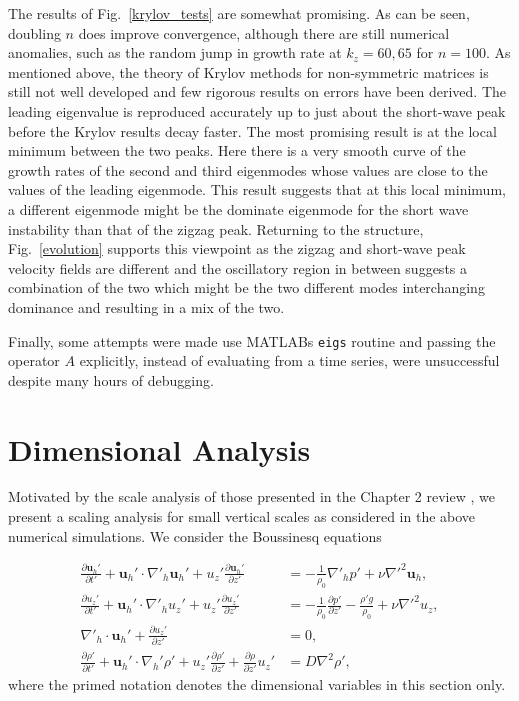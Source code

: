 The results of Fig.~\ref{krylov_tests} are somewhat promising. As can be seen, doubling $n$ does improve convergence, although there are still numerical anomalies, such as the random jump in growth rate at $k_{z}=60,65$ for $n=100$. As mentioned above, the theory of Krylov methods for non-symmetric matrices is still not well developed and few rigorous results on errors have been derived. The leading eigenvalue is reproduced accurately up to just about the short-wave peak before the Krylov results decay faster. The most promising result is at the local minimum between the two peaks. Here there is a very smooth curve of the growth rates of the second and third eigenmodes whose values are close to the values of the leading eigenmode. This result suggests that at this local minimum, a different eigenmode might be the dominate eigenmode for the short wave instability than that of the zigzag peak. Returning to the structure, Fig.~\ref{evolution} supports this viewpoint as the zigzag and short-wave peak velocity fields are different and the oscillatory region in between suggests a combination of the two which might be the two different modes interchanging dominance and resulting in a mix of the two. 

Finally, some attempts were made use MATLABs \texttt{eigs} routine and passing the operator $A$ explicitly, instead of evaluating from a time series, were unsuccessful despite many hours of debugging. 

\section{Dimensional Analysis}
Motivated by the scale analysis of those presented in the Chapter 2 review \cite{lilly1983,rileylelong2000,bc2001,brethouwer2007}, we present a scaling analysis for small vertical scales as considered in the above numerical simulations. We consider the Boussinesq equations

\begin{align}
\frac{\partial \textbf{u}_{h}'}{\partial t'} + \textbf{u}_{h}'\cdot\nabla'_{h}\textbf{u}_{h}'+u_{z}'\frac{\partial \textbf{u}_{h}'}{\partial z'} &= -\frac{1}{\rho_{0}}\nabla'_{h}p' + \nu \nabla'^{2}\textbf{u}_{h}\label{scaling_horz},\\
\frac{\partial u_{z}'}{\partial t'} + \textbf{u}_{h}'\cdot\nabla'_{h}u_{z}'+u_{z}'\frac{\partial u_{z}'}{\partial z'} &= -\frac{1}{\rho_{0}}\frac{\partial p'}{\partial z'} - \frac{\rho' g}{\rho_{0}} + \nu \nabla'^{2}u_{z},\label{scaling_vert}\\
\nabla'_{h}\cdot\textbf{u}_{h}' + \frac{\partial u_{z}'}{\partial z'} &=0,\label{scaling_cont}\\
\frac{\partial \rho'}{\partial t'} + \textbf{u}_{h}'\cdot\nabla_{h}'\rho' + u_{z}'\frac{\partial \rho'}{\partial z'} + \frac{\partial \rho}{\partial z'}u_{z}'&=D\nabla^{2}\rho ',\label{scaling_moment}
\end{align}
where the primed notation denotes the dimensional variables in this section only. 


